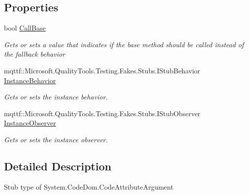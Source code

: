 \subsection*{Properties}
\begin{DoxyCompactItemize}
\item 
bool \hyperlink{class_system_1_1_code_dom_1_1_fakes_1_1_stub_code_attribute_argument_a06e0bf458043ccf823e86e168420f0e9}{Call\-Base}
\begin{DoxyCompactList}\small\item\em Gets or sets a value that indicates if the base method should be called instead of the fallback behavior\end{DoxyCompactList}\item 
mqttf\-::\-Microsoft.\-Quality\-Tools.\-Testing.\-Fakes.\-Stubs.\-I\-Stub\-Behavior \hyperlink{class_system_1_1_code_dom_1_1_fakes_1_1_stub_code_attribute_argument_a8b26cfdddd2cd77f0122d7607288c219}{Instance\-Behavior}
\begin{DoxyCompactList}\small\item\em Gets or sets the instance behavior.\end{DoxyCompactList}\item 
mqttf\-::\-Microsoft.\-Quality\-Tools.\-Testing.\-Fakes.\-Stubs.\-I\-Stub\-Observer \hyperlink{class_system_1_1_code_dom_1_1_fakes_1_1_stub_code_attribute_argument_ad6f67658626aa3e2efab8629cf62abb5}{Instance\-Observer}
\begin{DoxyCompactList}\small\item\em Gets or sets the instance observer.\end{DoxyCompactList}\end{DoxyCompactItemize}


\subsection{Detailed Description}
Stub type of System.\-Code\-Dom.\-Code\-Attribute\-Argument



